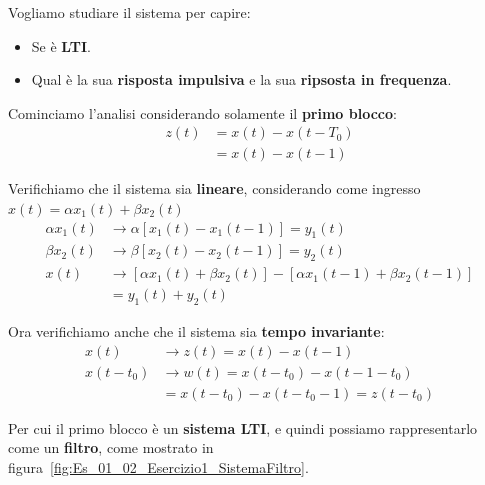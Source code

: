 \begin{exe}
    Vogliamo studiare il sistema per capire:
    \begin{itemize}
        \item Se è \textbf{LTI}.
        \item Qual è la sua \textbf{risposta impulsiva} e la sua
            \textbf{ripsosta in frequenza}.
    \end{itemize}
\end{exe}

Cominciamo l'analisi considerando solamente il \textbf{primo blocco}:
\[
    \begin{aligned}
        z(t) &= x(t) - x(t-T_{0}) \\ 
             &= x(t) - x(t-1)
    \end{aligned}
\]

Verifichiamo che il sistema sia \textbf{lineare}, considerando come
ingresso $x(t) = \alpha x_{1}(t) + \beta x_{2}(t)$
\[
    \begin{aligned}
        \alpha x_{1}(t) &\longrightarrow \alpha[ x_{1}(t) - x_{1}(t-1) ] = y_{1}(t) \\ 
        \beta x_{2}(t) &\longrightarrow \beta[x_{2}(t) - x_{2}(t-1)] = y_{2}(t) \\
        x(t) &\longrightarrow [\alpha x_{1}(t) + \beta x_{2}(t)] - [\alpha x_{1}(t-1) + \beta x_{2}(t-1)] \\ 
             &= y_{1}(t) + y_{2}(t)
    \end{aligned}
\]

Ora verifichiamo anche che il sistema sia \textbf{tempo invariante}:
\[
    \begin{aligned}
        x(t) &\longrightarrow z(t) = x(t) - x(t-1) \\ 
        x(t-t_{0}) &\longrightarrow w(t) = x(t-t_{0}) - x(t-1-t_{0}) \\ 
                   &= x(t-t_{0}) - x(t-t_{0}-1) = z(t-t_{0})
    \end{aligned}
\]
\begin{remark}
    Per cui il primo blocco è un \textbf{sistema LTI}, e quindi possiamo 
    rappresentarlo come un \textbf{filtro}, come mostrato in 
    figura~\ref{fig:Es_01_02_Esercizio1_SistemaFiltro}.
\end{remark}

